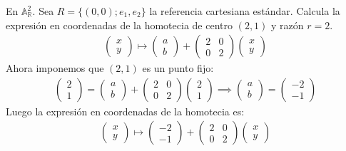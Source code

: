 \documentclass[14pt]{book}
\begin{document}
\begin{ej}
	En $\mathbb{A}_\mathbb{R}^2$. Sea $R = \{(0,0); e_1, e_2\}$ la referencia cartesiana estándar. Calcula la expresión en coordenadas de la homotecia de centro $(2,1)$ y razón $r = 2$.
	\begin{align*}
	\left(\begin{array}{c}
	x \\ y
	\end{array}\right) \mapsto
	\left(\begin{array}{c}
	a \\ b
	\end{array}\right) + 
	\left(\begin{array}{cc}
	2  & 0 \\ 0 & 2
	\end{array}\right)
	\left(\begin{array}{c}
	x \\ y
	\end{array}\right)
	\end{align*}
	Ahora imponemos que $(2, 1)$ es un punto fijo:
	\begin{align*}
	\left(\begin{array}{c}
	2 \\ 1
	\end{array}\right) =
	\left(\begin{array}{c}
	a \\ b
	\end{array}\right) + 
	\left(\begin{array}{cc}
	2  & 0 \\ 0 & 2
	\end{array}\right)
	\left(\begin{array}{c}
	2 \\ 1
	\end{array}\right) \implies \left(\begin{array}{c}
	a \\ b
	\end{array}\right) = \left(\begin{array}{c}
	-2 \\ -1
	\end{array}\right)
	\end{align*}
	Luego la expresión en coordenadas de la homotecia es:
		\begin{align*}
	\left(\begin{array}{c}
	x \\ y
	\end{array}\right) \mapsto
	\left(\begin{array}{c}
	-2 \\ -1
	\end{array}\right) + 
	\left(\begin{array}{cc}
	2  & 0 \\ 0 & 2
	\end{array}\right)
	\left(\begin{array}{c}
	x \\ y
	\end{array}\right)
	\end{align*}
	
\end{ej}
\end{document}
